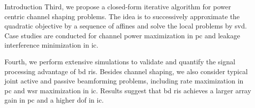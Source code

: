 \documentclass[journal]{IEEEtran}
\begin{document}
\begin{section}{Introduction}
	Third, we propose a closed-form iterative algorithm for power centric channel shaping problems.
	The idea is to successively approximate the quadratic objective by a sequence of affines and solve the local problems by \gls{svd}.
	Case studies are conducted for channel power maximization in \gls{pc} and leakage interference minimization in \gls{ic}.

	Fourth, we perform extensive simulations to validate and quantify the signal processing advantage of \gls{bd} \gls{ris}.
	Besides channel shaping, we also consider typical joint active and passive beamforming problems, including rate maximization in \gls{pc} and \gls{wsr} maximization in \gls{ic}.
	Results suggest that \gls{bd} \gls{ris} achieves a larger array gain in \gls{pc} and a higher \gls{dof} in \gls{ic}.
\end{section}


\end{document}
